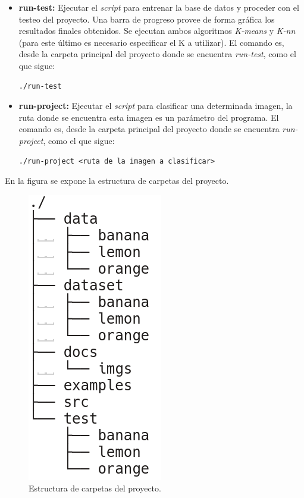 \documentclass[10pt,a4paper]{article}
\begin{document}
\begin{itemize}
\item \textbf{run-test:} Ejecutar el \textit{script} para entrenar la base de datos y proceder con el testeo del proyecto. Una barra de progreso provee de forma gráfica los resultados finales obtenidos. Se ejecutan ambos algoritmos \textit{K-means} y \textit{K-nn} (para este último es necesario especificar el K a utilizar). El comando es, desde la carpeta principal del proyecto donde se encuentra \textit{run-test}, como el que sigue:
\begin{verbatim}
./run-test
\end{verbatim}
\item \textbf{run-project:} Ejecutar el \textit{script} para clasificar una determinada imagen, la ruta donde se encuentra esta imagen es un parámetro del programa. El comando es, desde la carpeta principal del proyecto donde se encuentra \textit{run-project}, como el que sigue:
\begin{verbatim}
./run-project <ruta de la imagen a clasificar>
\end{verbatim}
\end{itemize}

En la figura se expone la estructura de carpetas del proyecto.

\begin{figure}[h]
\centering
\includegraphics[scale=0.4]{imgs/folders-structure.png}
\caption{Estructura de carpetas del proyecto.}
\label{folders}
\end{figure}
\end{document}

